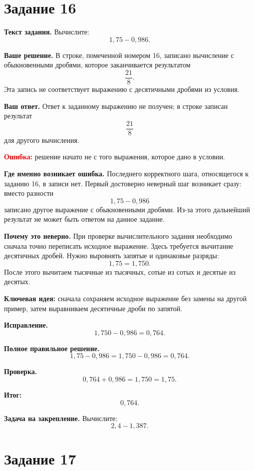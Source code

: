 \documentclass[12pt,a4paper]{article}
\begin{document}
\section*{Задание 16}

\textbf{Текст задания.}
Вычислите:
\[
1{,}75-0{,}986.
\]

\textbf{Ваше решение.}
В строке, помеченной номером 16, записано вычисление с обыкновенными дробями,
которое заканчивается результатом
\[
\frac{21}{8}.
\]
Эта запись не соответствует выражению с десятичными дробями из условия.

\textbf{Ваш ответ.}
Ответ к заданному выражению не получен; в строке записан результат
\[
\frac{21}{8}
\]
для другого вычисления.

\textcolor{red}{\textbf{Ошибка:}} решение начато не с того выражения, которое дано в условии.

\textbf{Где именно возникает ошибка.}
Последнего корректного шага, относящегося к заданию 16, в записи нет.
Первый достоверно неверный шаг возникает сразу: вместо разности
\[
1{,}75-0{,}986
\]
записано другое выражение с обыкновенными дробями.
Из-за этого дальнейший результат не может быть ответом на данное задание.

\textbf{Почему это неверно.}
При проверке вычислительного задания необходимо сначала точно переписать исходное выражение.
Здесь требуется вычитание десятичных дробей. Нужно выровнять запятые и одинаковые разряды:
\[
1{,}75=1{,}750.
\]
После этого вычитаем тысячные из тысячных, сотые из сотых и десятые из десятых.

\textcolor{blue!60!black}{\textbf{Ключевая идея:}}
сначала сохраняем исходное выражение без замены на другой пример, затем выравниваем десятичные дроби по запятой.

\textbf{Исправление.}
\[
1{,}750-0{,}986=0{,}764.
\]

\textbf{Полное правильное решение.}
\[
1{,}75-0{,}986
=1{,}750-0{,}986
=0{,}764.
\]

\textbf{Проверка.}
\[
0{,}764+0{,}986=1{,}750=1{,}75.
\]

\textcolor{teal!60!black}{\textbf{Итог:}}
\[
\boxed{0{,}764}.
\]

\textbf{Задача на закрепление.}
Вычислите:
\[
2{,}4-1{,}387.
\]

\newpage
{}
\label{task:17}
\section*{Задание 17}
\end{document}
